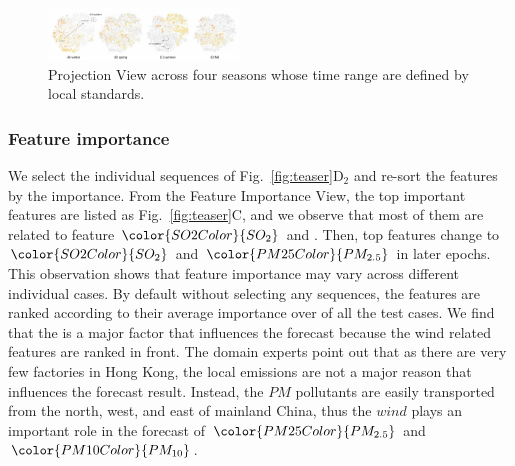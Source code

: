 
\begin{figure}[t]
	\centering
	\includegraphics[width=0.45\textwidth]{figure/MultiRNNExplorer/Evaluation/seasonal_behavior.pdf}
	\vspace{-3mm}
	\caption{Projection View across four seasons whose time range are defined by local standards.}
	\label{fig:seasonal_feature}
	\vspace{-4mm}
\end{figure}

\subsubsection{Feature importance}
We select the individual sequences of Fig.~\ref{fig:teaser}D$_2$ and re-sort the features by the importance. 
From the Feature Importance View, the top important features are listed as Fig.~\ref{fig:teaser}C, and we observe that most of them are related to feature $\color{SO2Color}{SO_{2}}$ and \textit{\color{WINDColor}{Wind Speed}}.
Then, top features change to $\color{SO2Color}{SO_2}$ and $\color{PM25Color}{PM_{2.5}}$ in later epochs. 
This observation shows that feature importance may vary across different individual cases. 
By default without selecting any sequences, the features are ranked according to their average importance over of all the test cases. 
We find that the \textit{\color{WINDColor}{Wind Speed}} is a major factor that influences the forecast because the wind related features are ranked in front.
The domain experts point out that as there are very few factories in Hong Kong, the local emissions are not a major reason that influences the forecast result. 
Instead, the $PM$ pollutants are easily transported from the north, west, and east of mainland China, thus the $wind$ plays an important role in the forecast of $\color{PM25Color}{PM_{2.5}}$ and $\color{PM10Color}{PM_{10}}$.

